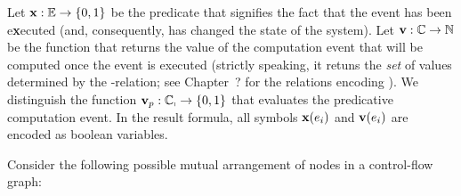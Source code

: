Let $\mathbf{x} : \mathbb{E} \rightarrow \{0,1\}$ be the predicate that signifies the fact that the event has been e\textbf{x}ecuted (and, consequently, has changed the state of the system).
Let $\mathbf{v} : \mathbb{C} \rightarrow \mathbb{N}$ be the function that returns the value of the computation event that will be computed once the event is executed (strictly speaking, it retuns the \textit{set} of values determined by the -relation; see Chapter~? for the relations encoding%
). We distinguish the function $\mathbf{v}_p : \mathbb{C_p} \rightarrow \{0,1\}$ that evaluates the predicative computation event. In the result formula, all symbols $\mathbf{x}(e_i)$ and $\mathbf{v}(e_i)$ are encoded as boolean variables.

Consider the following possible mutual arrangement of nodes in a control-flow graph:


